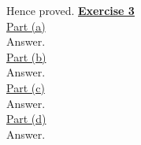 \documentclass[a4paper, 11pt]{article}
\begin{document}
Hence proved.
\newpage
\textbf{\underline{Exercise 3}}\\
\newline \underline{Part (a)}\\
\newline Answer.\\
\newline \underline{Part (b)}\\
\newline Answer.\\
\newline \underline{Part (c)}\\
\newline Answer.\\
\newline \underline{Part (d)}\\
\newline Answer.
\end{document}
